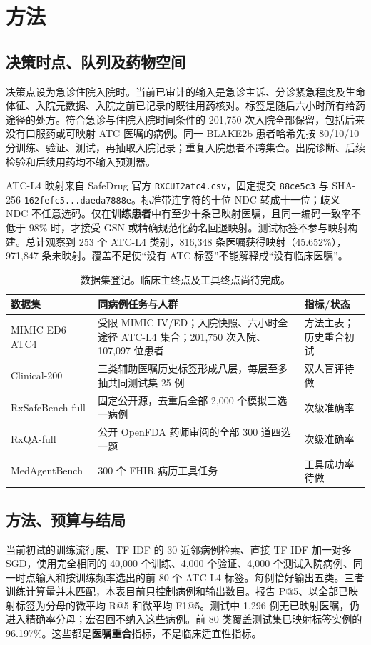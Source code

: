 \documentclass[UTF8,11pt,a4paper]{ctexart}
\begin{document}
\section{方法}
\subsection{决策时点、队列及药物空间}
决策点设为急诊住院入院时。当前已审计的输入是急诊主诉、分诊紧急程度及生命体征、入院元数据、入院之前已记录的既往用药核对。标签是随后六小时所有给药途径的处方。符合急诊与住院入院时间条件的 201,750 次入院全部保留，包括后来没有口服药或可映射 ATC 医嘱的病例。同一 BLAKE2b 患者哈希先按 80/10/10 分训练、验证、测试，再抽取入院记录；重复入院患者不跨集合。出院诊断、后续检验和后续用药均不输入预测器。

ATC-L4 映射来自 SafeDrug 官方 \texttt{RXCUI2atc4.csv}，固定提交 \texttt{88ce5c3} 与 SHA-256 \texttt{162fefc5...daeda7888e}。标准带连字符的十位 NDC 转成十一位；歧义 NDC 不任意选码。仅在\textbf{训练患者}中有至少十条已映射医嘱，且同一编码一致率不低于 98\% 时，才接受 GSN 或精确规范化药名回退映射。测试标签不参与映射构建。总计观察到 253 个 ATC-L4 类别，816,348 条医嘱获得映射（45.652\%），971,847 条未映射。覆盖不足使“没有 ATC 标签”不能解释成“没有临床医嘱”。

\begin{table}[t]
\centering\small
\caption{数据集登记。临床主终点及工具终点尚待完成。}
\label{tab:data}
\begin{tabularx}{\linewidth}{@{}p{2.4cm}X p{2.5cm}@{}}
\toprule
数据集 & 同病例任务与人群 & 指标/状态 \\
\midrule
MIMIC-ED6-ATC4 & 受限 MIMIC-IV/ED；入院快照、六小时全途径 ATC-L4 集合；201,750 次入院、107,097 位患者 & 方法主表；历史重合初试 \\
Clinical-200 & 三类辅助医嘱历史标签形成八层，每层至多抽共同测试集 25 例 & 双人盲评待做 \\
RxSafeBench-full & 固定公开源，去重后全部 2,000 个模拟三选一病例 & 次级准确率 \\
RxQA-full & 公开 OpenFDA 药师审阅的全部 300 道四选一题 & 次级准确率 \\
MedAgentBench & 300 个 FHIR 病历工具任务 & 工具成功率待做 \\
\bottomrule
\end{tabularx}
\end{table}

\subsection{方法、预算与结局}
当前初试的训练流行度、TF-IDF 的 30 近邻病例检索、直接 TF-IDF 加一对多 SGD，使用完全相同的 40,000 个训练、4,000 个验证、4,000 个测试入院病例、同一时点输入和按训练频率选出的前 80 个 ATC-L4 标签。每例恰好输出五类。三者训练计算量并未匹配，本表目前只控制病例和输出数目。报告 P@5、以全部已映射标签为分母的微平均 R@5 和微平均 F1@5。测试中 1,296 例无已映射医嘱，仍进入精确率分母；宏召回不纳入这些病例。前 80 类覆盖测试集已映射标签实例的 96.197\%。这些都是\textbf{医嘱重合}指标，不是临床适宜性指标。
\end{document}
